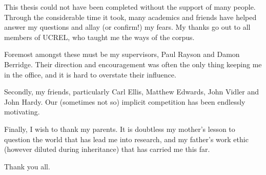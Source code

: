 
This thesis could not have been completed without the support of many people.  Through the considerable time it took, many academics and friends have helped answer my questions and allay (or confirm!) my fears.  My thanks go out to all members of UCREL, who taught me the ways of the corpus.

Foremost amongst these must be my supervisors, Paul Rayson and Damon Berridge.  Their direction and encouragement was often the only thing keeping me in the office, and it is hard to overstate their influence.

Secondly, my friends, particularly Carl Ellis, Matthew Edwards, John Vidler and John Hardy.  Our (sometimes not so) implicit competition has been endlessly motivating.

Finally, I wish to thank my parents.  It is doubtless my mother's lesson to question the world that has lead me into research, and my father's work ethic (however diluted during inheritance) that has carried me this far.

\begin{center}
Thank you all.
\end{center}



